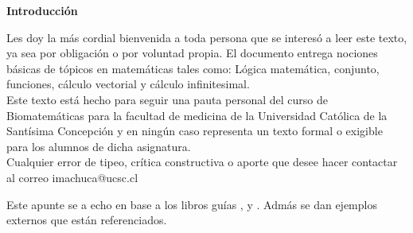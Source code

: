 
\begin{center}\textbf{Introducción}\end{center}

Les doy la más cordial bienvenida a toda persona que se interesó a leer este texto, ya sea por obligación o por voluntad propia. El documento entrega nociones básicas de tópicos en matemáticas tales como: Lógica matemática, conjunto, funciones, cálculo vectorial y cálculo infinitesimal.\\

Este texto está hecho para seguir una pauta personal del curso de Biomatemáticas para la facultad de medicina de la Universidad Católica de la Santísima Concepción y en ningún caso representa un texto formal o exigible para los alumnos de dicha asignatura.\\

Cualquier error de tipeo, crítica constructiva o aporte que desee hacer contactar al correo imachuca@ucsc.cl 

Este apunte se a echo en base a los libros guías \cite{Zill}, \cite{Larson} y \cite{Schaum}. Admás se dan ejemplos externos que están referenciados.

\cleardoublepage
